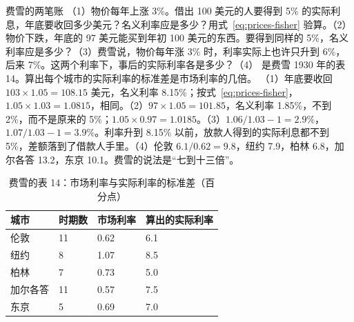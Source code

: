 \begin{example}{费雪的两笔账}\label{ex:wicksell-fisher}
（1）物价每年上涨 3\%。借出 100 美元的人要得到 5\% 的实际利息，年底要收回多少美元？名义利率应是多少？用式~\eqref{eq:prices-fisher} 验算。（2）物价下跌，年底的 97 美元能买到年初 100 美元的东西。要得到同样的 5\%，名义利率应是多少？（3）费雪说，物价每年涨 3\% 时，利率实际上也许只升到 6\%，后来 7\%\cite{fisher1911}。这两个利率下，事后的实际利率各是多少？（4） 是费雪 1930 年的表 14。算出每个城市的实际利率的标准差是市场利率的几倍。
\solution （1）年底要收回 $103\times1.05=108.15$ 美元，名义利率 8.15\%；按式~\eqref{eq:prices-fisher}，$1.05\times1.03=1.0815$，相同\cite{fisher1911}。（2）$97\times1.05=101.85$，名义利率 1.85\%，不到 2\%，而不是原来的 5\%；$1.05\times0.97=1.0185$\cite{fisher1911}。（3）$1.06/1.03-1=2.9\%$，$1.07/1.03-1=3.9\%$。利率升到 8.15\% 以前，放款人得到的实际利息都不到 5\%，差额落到了借款人手里。（4）伦敦 $6.1/0.62=9.8$，纽约 7.9，柏林 6.8，加尔各答 13.2，东京 10.1。费雪的说法是“七到十三倍”\cite{fisher1930}。
\end{example}

\begin{table}[htbp]\centering\small
\caption{费雪的表 14：市场利率与实际利率的标准差（百分点）}\label{tab:wicksell-fisher14}
\begin{tabularx}{\linewidth}{@{}YYYY@{}}
\toprule
城市 & 时期数 & 市场利率 & 算出的实际利率 \\\midrule
伦敦 & 11 & 0.62 & 6.1 \\
纽约 & 8 & 1.07 & 8.5 \\
柏林 & 7 & 0.73 & 5.0 \\
加尔各答 & 11 & 0.57 & 7.5 \\
东京 & 5 & 0.69 & 7.0 \\
\bottomrule
\end{tabularx}
\end{table}

